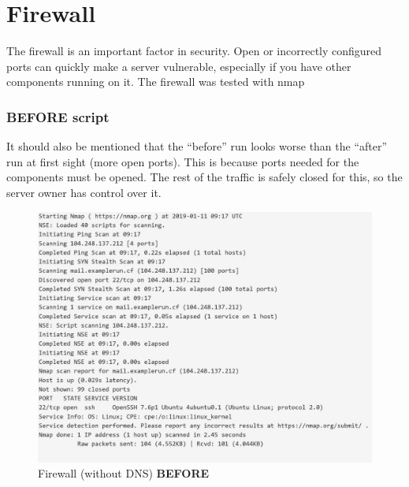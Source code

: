 \section{Firewall}
The firewall is an important factor in security. Open or incorrectly configured ports can quickly make a server vulnerable, especially if you have other components running on it.
The firewall was tested with nmap \cite{nmap-portscan}


\subsubsection{BEFORE script}
It should also be mentioned that the ``before'' run looks worse than the ``after'' run at first sight (more open ports). 
This is because ports needed for the components must be opened. The rest of the traffic is safely closed for this, so the server owner has control over it.

\begin{figure}[H]
	\centering
	\includegraphics[width=\linewidth]{pics/fw_before_no_dns}
    \caption{Firewall (without DNS) \textbf{BEFORE}}
	\label{fig:firewallnodnsbefore}
\end{figure}

